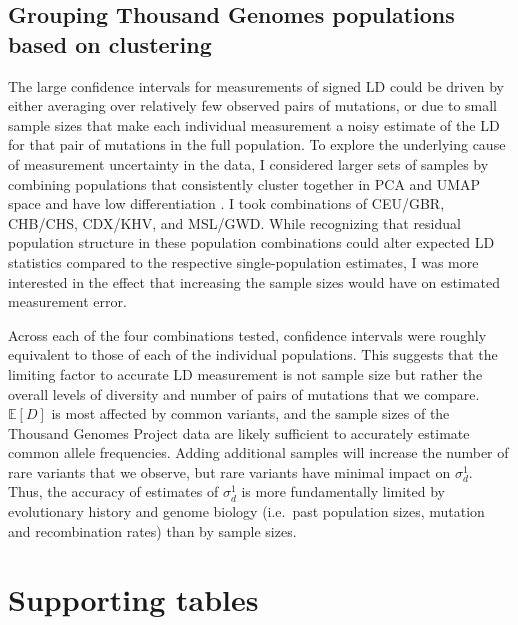 \documentclass[]{article}
\begin{document}
\subsection{Grouping Thousand Genomes populations based on clustering}
\label{grouping-thousand-genomes-populations-based-on-clustering}

The large confidence intervals for measurements of signed LD could be driven by
either averaging over relatively few observed pairs of mutations, or due to
small sample sizes that make each individual measurement a noisy estimate of
the LD for that pair of mutations in the full population. To explore the
underlying cause of measurement uncertainty in the
\citet{1000_Genomes_Project_Consortium2015-zq} data, I considered larger sets of
samples by combining populations that consistently cluster together in PCA and
UMAP space and have low differentiation \citep{Diaz-Papkovich2020-ee}. I took
combinations of CEU/GBR, CHB/CHS, CDX/KHV, and MSL/GWD. While recognizing that
residual population structure in these population combinations could alter
expected LD statistics compared to the respective single-population estimates,
I was more interested in the effect that increasing the sample sizes would have
on estimated measurement error.

Across each of the four combinations tested, confidence intervals were roughly
equivalent to those of each of the individual populations. This suggests that
the limiting factor to accurate LD measurement is not sample size but rather
the overall levels of diversity and number of pairs of mutations that we
compare. \(\mathbb{E}[D]\) is most affected by common variants, and the sample
sizes of the Thousand Genomes Project data are likely sufficient to accurately
estimate common allele frequencies. Adding additional samples will increase the
number of rare variants that we observe, but rare variants have minimal impact
on \(\sigma_d^1\). Thus, the accuracy of estimates of \(\sigma_d^1\) is more
fundamentally limited by evolutionary history and genome biology (i.e.~past
population sizes, mutation and recombination rates) than by sample sizes.





\clearpage
\newpage

\section*{Supporting tables}
\end{document}
